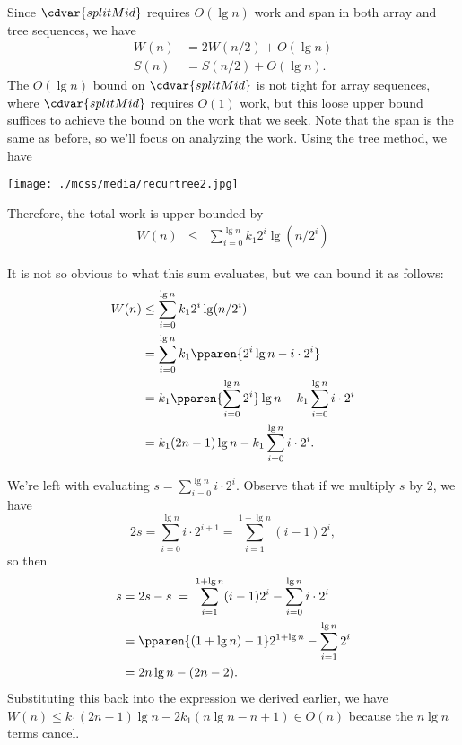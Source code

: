\begin{cluster}
\label{grp:grm:mcss::analysis}

\begin{gram}
\label{grm:mcss::analysis}
Since $\cdvar{splitMid}$ requires $O(\lg n)$ work and
span in both array and tree sequences, we have
\[ \begin{align*}
  W(n) &= 2 W(n/2) + O(\lg n)\\
  S(n) &= S(n/2) + O(\lg n).
\end{align*} \]
The $O(\lg{n})$ bound on $\cdvar{splitMid}$ is not tight for array sequences, where $\cdvar{splitMid}$ requires $O(1)$ work, but this loose upper bound suffices to achieve the bound on the work that we seek.
Note that the
span is the same as before, so we'll focus on analyzing the work.  Using the
tree method, we have
\begin{center}
  \texttt{[image: ./mcss/media/recurtree2.jpg]}
\end{center}

Therefore, the total work is upper-bounded by
\begin{eqnarray*}
  W(n) &\leq& \sum_{i=0}^{\lg n} k_1 2^i \lg (n/2^i)
\end{eqnarray*}

It is not so obvious to what this sum evaluates, but we can bound it
as follows:
\[ \begin{align*}
  W(n) &\leq \sum_{i=0}^{\lg n} k_1 2^i \lg (n/2^i) \\
  &= \sum_{i=0}^{\lg n} k_1 \pparen{2^i\lg n - i\cdot 2^i} \\
  &= k_1\pparen{\sum_{i=0}^{\lg n} 2^i}\lg n - k_1\sum_{i=0}^{\lg n} i\cdot 2^i\\
  &= k_1(2n - 1)\lg n - k_1\sum_{i=0}^{\lg n} i\cdot 2^i.
\end{align*} \]

We're left with evaluating $s = \sum_{i=0}^{\lg n} i\cdot 2^i$.  Observe that
if we multiply $s$ by $2$, we have
\[
2s = \sum_{i=0}^{\lg n} i\cdot 2^{i+1} = \sum_{i=1}^{1 + \lg n} (i-1)2^i,
\]
so then
\[ \begin{align*}
s &= 2s - s \;=\; \sum_{i=1}^{1 + \lg n} (i-1)2^i - \sum_{i=0}^{\lg n} i\cdot 2^i\\
&= \pparen{(1 + \lg n)  - 1}2^{1 + \lg n} - \sum_{i=1}^{\lg n} 2^i \\
&= 2n\lg n - (2n -2).
\end{align*} \]
Substituting this back into the expression we derived earlier, we have $W(n)
\leq k_1(2n - 1)\lg n - 2k_1(n \lg n - n + 1) \in O(n)$ because the $n\lg n$
terms cancel.

\end{gram}
\end{cluster}

